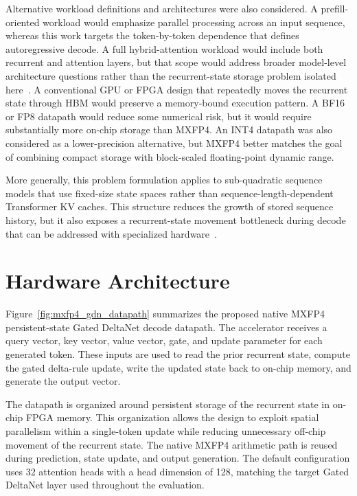 ﻿\documentclass[conference]{IEEEtran}
\begin{document}
Alternative workload definitions and architectures were also considered. A prefill-oriented workload would emphasize parallel processing across an input sequence, whereas this work targets the token-by-token dependence that defines autoregressive decode. A full hybrid-attention workload would include both recurrent and attention layers, but that scope would address broader model-level architecture questions rather than the recurrent-state storage problem isolated here~\cite{b3,b8,b9,b11}. A conventional GPU or FPGA design that repeatedly moves the recurrent state through HBM would preserve a memory-bound execution pattern. A BF16 or FP8 datapath would reduce some numerical risk, but it would require substantially more on-chip storage than MXFP4. An INT4 datapath was also considered as a lower-precision alternative, but MXFP4 better matches the goal of combining compact storage with block-scaled floating-point dynamic range.

More generally, this problem formulation applies to sub-quadratic sequence models that use fixed-size state spaces rather than sequence-length-dependent Transformer KV caches. This structure reduces the growth of stored sequence history, but it also exposes a recurrent-state movement bottleneck during decode that can be addressed with specialized hardware~\cite{b2,b10}.

\section{Hardware Architecture}

Figure~\ref{fig:mxfp4_gdn_datapath} summarizes the proposed native MXFP4 persistent-state Gated DeltaNet decode datapath. The accelerator receives a query vector, key vector, value vector, gate, and update parameter for each generated token. These inputs are used to read the prior recurrent state, compute the gated delta-rule update, write the updated state back to on-chip memory, and generate the output vector.

The datapath is organized around persistent storage of the recurrent state in on-chip FPGA memory. This organization allows the design to exploit spatial parallelism within a single-token update while reducing unnecessary off-chip movement of the recurrent state. The native MXFP4 arithmetic path is reused during prediction, state update, and output generation. The default configuration uses 32 attention heads with a head dimension of 128, matching the target Gated DeltaNet layer used throughout the evaluation.
\end{document}
